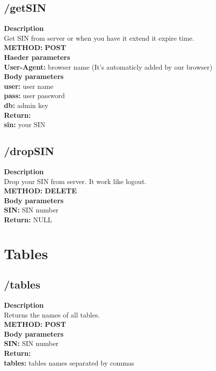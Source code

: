\documentclass[a4paper, 12pt]{report}
\begin{document}
\subsection{/getSIN}
\textbf{\color{redText} Description} \\
Get SIN from server or when you have it extend it expire time. \\
\textbf{\color{redText} METHOD: } \textbf{POST} \\
\textbf{\color{redText} Haeder parameters} \\
\textbf{User-Agent: } browser name (It's automaticly added by our browser)\\
\textbf{\color{redText} Body parameters} \\
\textbf{user: } user name\\
\textbf{pass: } user password\\
\textbf{db: } admin key \\
\textbf{\color{redText} Return: }\\
\textbf{sin: } your SIN 

\subsection{/dropSIN}
\textbf{\color{redText} Description} \\
Drop your SIN from server. It work like logout. \\
\textbf{\color{redText} METHOD: } \textbf{DELETE} \\
\textbf{\color{redText} Body parameters} \\
\textbf{SIN: } SIN number\\
\textbf{\color{redText} Return: } NULL

\section{Tables}

\subsection{/tables}
\textbf{\color{redText} Description} \\
Returns the names of all tables. \\
\textbf{\color{redText} METHOD: } \textbf{POST} \\
\textbf{\color{redText} Body parameters} \\
\textbf{SIN: } SIN number\\
\textbf{\color{redText} Return: } \\
\textbf{tables: } tables names separated by commas
\end{document}
